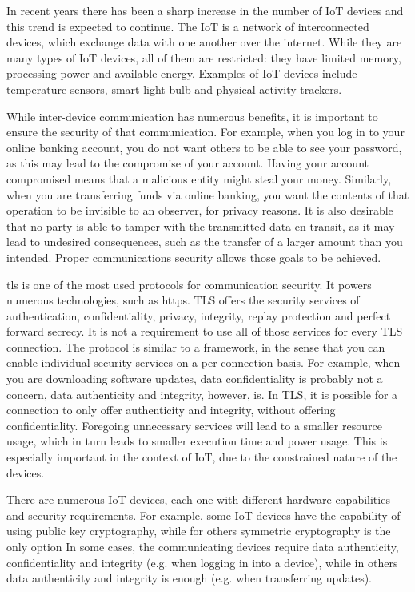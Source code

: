 \documentclass{llncs}
\begin{document}
In recent years there has been a sharp increase in the number of IoT
devices and this trend is expected to continue. The IoT is a network
of interconnected devices, which exchange data with one another over
the internet. While they are many types of IoT devices, all of them
are restricted: they have limited memory, processing power and
available energy. Examples of IoT devices include temperature sensors,
smart light bulb and physical activity trackers.

While inter-device communication has numerous benefits, it is important
to ensure the security of that communication. For example, when you log
in to your online banking account, you do not want others to be
able to see your password, as this may lead to the compromise of your
account. Having your account compromised means that a malicious entity
might steal your money. Similarly, when you are transferring funds via
online banking, you want the contents of that operation to be
invisible to an observer, for privacy reasons. It is also desirable
that no party is able to tamper with the transmitted data en transit,
as it may lead to undesired consequences, such as the transfer of a
larger amount than you intended. Proper communications security allows
those goals to be achieved.

\gls{tls} is one of the most used protocols for communication security. It
powers numerous technologies, such as \gls{https}. TLS offers the
security services of authentication, confidentiality, privacy, integrity, replay
protection and perfect forward secrecy. It is not a requirement to use all of
those services for every TLS connection. The protocol is similar to
a framework, in the sense that you can enable individual security
services on a per-connection basis. For example, when you are downloading
software updates, data confidentiality is probably not a concern,
data authenticity and integrity, however, is. In TLS, it is possible for a connection
to only offer authenticity and integrity, without offering confidentiality.
Foregoing unnecessary services will lead to a smaller resource usage,
which in turn leads to smaller execution time and power usage. This
is especially important in the context of IoT, due to the constrained
nature of the devices.

There are numerous IoT devices, each one with different hardware
capabilities and security requirements. For example, some IoT
devices have the capability of using public key cryptography,
while for others symmetric cryptography is the only option
In some cases, the communicating devices require data authenticity, confidentiality
and integrity (e.g. when logging in into a device), while in others data
authenticity and integrity is enough (e.g. when transferring updates).
\end{document}
